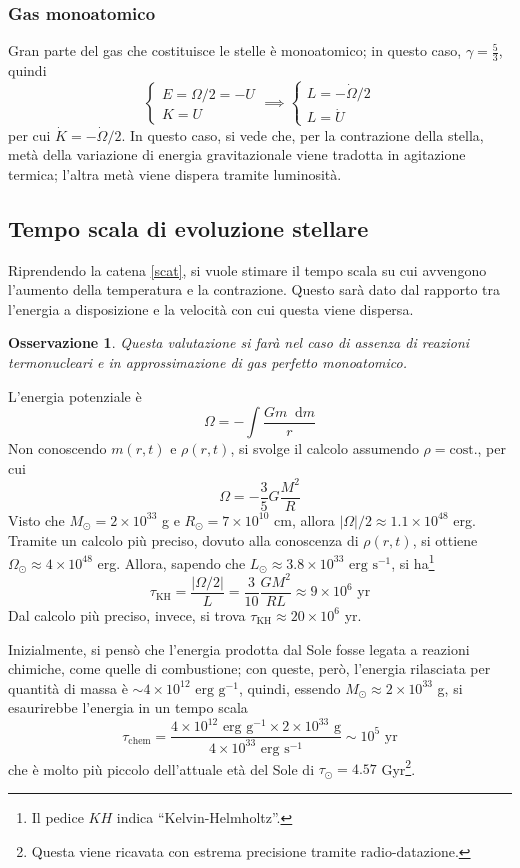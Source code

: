 \documentclass[11pt, a4paper]{scrartcl}
\theoremstyle{style}
\newtheorem{osservazione}{Osservazione}[section]
\theoremstyle{style1}
\newcommand{\dd}{\mathop{}\!\mathrm{d}}
\numberwithin{equation}{subsection}
\begin{document}
\subsubsection{Gas monoatomico}
Gran parte del gas che costituisce le stelle \`e monoatomico; in questo caso, $\gamma = \frac{5}{3}$, quindi
\[
\begin{cases}
	E = \Omega  / 2 = - U \\
	K = U
\end{cases} \implies \begin{cases}
	L = - \dot{\Omega } / 2 \\ 
	L = \dot{U}
\end{cases}
\] 
per cui $\dot{K} = - \dot{\Omega } / 2$.
In questo caso, si vede che, per la contrazione della stella, met\`a della variazione di energia gravitazionale viene tradotta in agitazione termica; l'altra met\`a viene dispera tramite luminosit\`a.
\subsection{Tempo scala di evoluzione stellare}
Riprendendo la catena \ref{scat}, si vuole stimare il tempo scala su cui avvengono l'aumento della temperatura e la contrazione.
Questo sar\`a dato dal rapporto tra l'energia a disposizione e la velocit\`a con cui questa viene dispersa.
\begin{osservazione}
Questa valutazione si far\`a nel caso di assenza di reazioni termonucleari e in approssimazione di gas perfetto monoatomico.
\end{osservazione}
\noindent L'energia potenziale \`e
\[
\Omega  = - \int \frac{G m \dd m}{r}
\] 
Non conoscendo $m(r,t)$ e $\rho (r,t)$, si svolge il calcolo assumendo $\rho  = \text{cost.}$, per cui 
\[
\Omega  = - \frac{3}{5} G \frac{M^2}{R}
\] 
Visto che $M_\odot = 2\times 10^{33}$ g e $R_\odot = 7 \times 10^{10}$ cm, allora $|\Omega | / 2\approx 1.1 \times 10 ^{48}$ erg.
Tramite un calcolo pi\`u preciso, dovuto alla conoscenza di $\rho (r,t)$, si ottiene $\Omega _\odot \approx 4 \times 10^{48}$ erg.
Allora, sapendo che $L_\odot \approx 3.8 \times 10^{33} \text{ erg s}^{-1}$, si ha\footnote{Il pedice $KH$ indica ``Kelvin-Helmholtz''.}
\[
\tau _\text{KH} = \frac{\lvert \Omega /2 \rvert }{L} = \frac{3}{10} \frac{GM^2}{RL} \approx 9 \times 10^{6} \text{ yr} 
\] 
Dal calcolo pi\`u preciso, invece, si trova $\tau _\text{KH} \approx 20 \times 10 ^{6}$ yr.

Inizialmente, si pens\`o che l'energia prodotta dal Sole fosse legata a reazioni chimiche, come quelle di combustione; con queste, per\`o, l'energia rilasciata per quantit\`a di massa \`e $\sim 4\times 10^{12} \text{ erg g}^{-1}$, quindi, essendo $M_\odot \approx 2 \times 10^{33}$ g, si esaurirebbe l'energia in un tempo scala
\[
\tau _\text{chem} = \frac{4 \times 10^{12} \text{ erg g}^{-1} \times 2\times 10^{33}\text{ g}}{4 \times 10^{33} \text{ erg s}^{-1}} \sim 10^{5}\text{ yr}
\] 
che \`e molto pi\`u piccolo dell'attuale et\`a del Sole di $\tau _\odot = 4.57$ Gyr\footnote{Questa viene ricavata con estrema precisione tramite radio-datazione.}.
\end{document}
